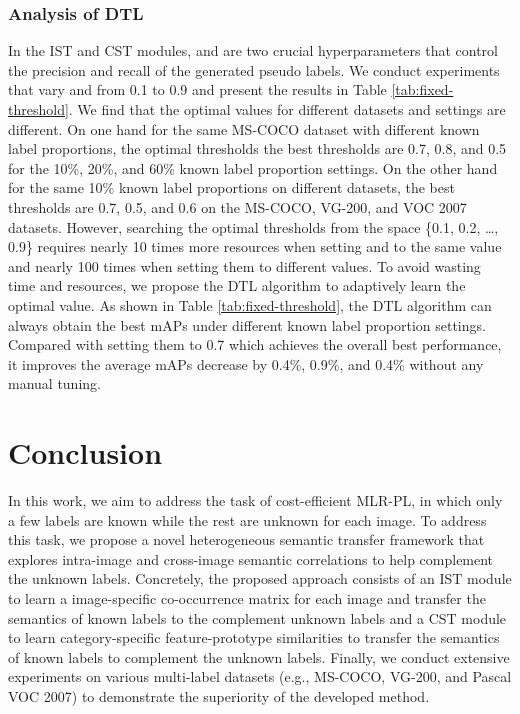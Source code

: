 \subsubsection{Analysis of DTL}
\label{sec:exp-dtl}
In the IST and CST modules,  and  are two crucial hyperparameters that control the precision and recall of the generated pseudo labels. We conduct experiments that vary  and  from 0.1 to 0.9 and present the results in Table \ref{tab:fixed-threshold}. We find that the optimal values for different datasets and settings are different. On one hand for the same MS-COCO dataset with different known label proportions, the optimal thresholds the best thresholds are 0.7, 0.8, and 0.5 for the 10\%, 20\%, and 60\% known label proportion settings. On the other hand for the same 10\% known label proportions on different datasets, the best thresholds are 0.7, 0.5, and 0.6 on the MS-COCO, VG-200, and VOC 2007 datasets. However, searching the optimal thresholds from the space \{0.1, 0.2, \dots, 0.9\} requires nearly 10 times more resources when setting  and  to the same value and nearly 100 times when setting them to different values. To avoid wasting time and resources, we propose the DTL algorithm to adaptively learn the optimal value. As shown in Table \ref{tab:fixed-threshold}, the DTL algorithm can always obtain the best mAPs under different known label proportion settings. Compared with setting them to 0.7 which achieves the overall best performance, it improves the average mAPs decrease by 0.4\%, 0.9\%, and 0.4\% without any manual tuning.





\section{Conclusion}
\label{sec:conclusion}
In this work, we aim to address the task of cost-efficient MLR-PL, in which only a few labels are known while the rest are unknown for each image. To address this task, we propose a novel heterogeneous semantic transfer framework that explores intra-image and cross-image semantic correlations to help complement the unknown labels. Concretely, the proposed approach consists of an IST module to learn a image-specific co-occurrence matrix for each image and transfer the semantics of known labels to the complement unknown labels and a CST module to learn category-specific feature-prototype similarities to transfer the semantics of known labels to complement the unknown labels. Finally, we conduct extensive experiments on various multi-label datasets (e.g., MS-COCO, VG-200, and Pascal VOC 2007) to demonstrate the superiority of the developed method.


